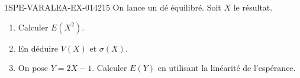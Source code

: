 \begin{exercice}{1SPE-VARALEA-EX-014}{2}{15}
On lance un dé équilibré. Soit $X$ le résultat.

\begin{enumerate}
  \item Calculer $E(X^2)$.
  \item En déduire $V(X)$ et $\sigma(X)$.
  \item On pose $Y = 2X - 1$. Calculer $E(Y)$ en utilisant la linéarité de l'espérance.
\end{enumerate}
\end{exercice}
